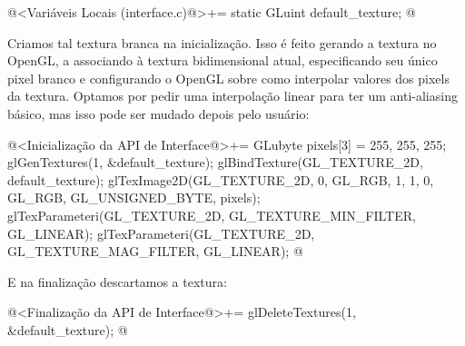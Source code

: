 \iniciocodigo
@<Variáveis Locais (interface.c)@>+=
static GLuint default_texture;
@
\fimcodigo

Criamos tal textura branca na inicialização. Isso é feito gerando a
textura no OpenGL, a associando à textura bidimensional atual,
especificando seu único pixel branco e configurando o OpenGL sobre
como interpolar valores dos pixels da textura. Optamos por pedir uma
interpolação linear para ter um anti-aliasing básico, mas isso pode
ser mudado depois pelo usuário:

\iniciocodigo
@<Inicialização da API de Interface@>+=
{
  GLubyte pixels[3] = {255, 255, 255};
  glGenTextures(1, &default_texture);
  glBindTexture(GL_TEXTURE_2D, default_texture);
  glTexImage2D(GL_TEXTURE_2D, 0, GL_RGB, 1, 1, 0, GL_RGB, GL_UNSIGNED_BYTE,
               pixels);
  glTexParameteri(GL_TEXTURE_2D, GL_TEXTURE_MIN_FILTER, GL_LINEAR);
  glTexParameteri(GL_TEXTURE_2D, GL_TEXTURE_MAG_FILTER, GL_LINEAR);
}
@
\fimcodigo

E na finalização descartamos a textura:

\iniciocodigo
@<Finalização da API de Interface@>+=
glDeleteTextures(1, &default_texture);
@
\fimcodigo







\fim
